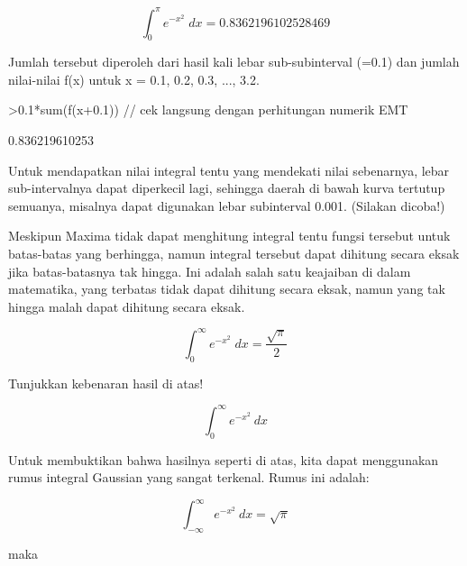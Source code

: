 \documentclass{article}
\begin{document}
\begin{eulernotebook}
\begin{eulercomment}
\begin{eulercomment}
\begin{eulercomment}
\begin{eulercomment}
\begin{eulercomment}
\end{eulercomment}
\begin{eulerformula}
\[
\int_{0}^{\pi}{e^ {- x^2 }\;dx}=0.8362196102528469
\]
\end{eulerformula}
\begin{eulercomment}
Jumlah tersebut diperoleh dari hasil kali lebar sub-subinterval (=0.1)
dan jumlah nilai-nilai f(x) untuk x = 0.1, 0.2, 0.3, ..., 3.2.
\end{eulercomment}
\begin{eulerprompt}
>0.1*sum(f(x+0.1)) // cek langsung dengan perhitungan numerik EMT
\end{eulerprompt}
\begin{euleroutput}
  0.836219610253
\end{euleroutput}
\begin{eulercomment}
Untuk mendapatkan nilai integral tentu yang mendekati nilai sebenarnya, lebar
sub-intervalnya dapat diperkecil lagi, sehingga daerah di bawah kurva tertutup
semuanya, misalnya dapat digunakan lebar subinterval 0.001. (Silakan dicoba!)

Meskipun Maxima tidak dapat menghitung integral tentu fungsi tersebut untuk
batas-batas yang berhingga, namun integral tersebut dapat dihitung secara eksak jika
batas-batasnya tak hingga. Ini adalah salah satu keajaiban di dalam matematika, yang
terbatas tidak dapat dihitung secara eksak, namun yang tak hingga malah dapat
dihitung secara eksak.
\end{eulercomment}
\begin{eulerformula}
\[
\int_{0}^{\infty }{e^ {- x^2 }\;dx}=\frac{\sqrt{\pi}}{2}
\]
\end{eulerformula}
\begin{eulercomment}
Tunjukkan kebenaran hasil di atas!

\end{eulercomment}
\begin{eulerformula}
\[
\int_{0}^{\infty} e^{-x^2} \ dx
\]
\end{eulerformula}
\begin{eulercomment}
Untuk membuktikan bahwa hasilnya seperti di atas, kita dapat
menggunakan rumus integral Gaussian yang sangat terkenal. Rumus ini
adalah:

\end{eulercomment}
\begin{eulerformula}
\[
\int_{-\infty}^{\infty} e^{-x^2} \ dx = \sqrt{\pi}
\]
\end{eulerformula}
\begin{eulercomment}
maka


\end{eulercomment}
\end{eulercomment}
\end{eulercomment}
\end{eulercomment}
\end{eulercomment}
\end{eulernotebook}
\end{document}
